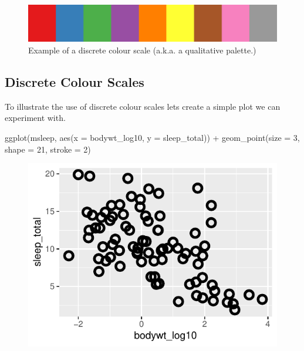 \vspace{2em}

\begin{figure}[H]
\centering
\includegraphics[scale = .4]{graphics/ch2Figs/col_discrete.pdf}
\caption{Example of a discrete colour scale (a.k.a. a qualitative palette.)}
\label{fig:discrete_col_scale}
\end{figure}

\vspace{1em}

\subsection{Discrete Colour Scales}
\label{sec:discrete_cols}

To illustrate the use of discrete colour scales lets create a simple plot we can experiment with.

\begin{inR}
ggplot(msleep, aes(x = bodywt_log10, y = sleep_total)) +
  geom_point(size = 3, shape = 21, stroke = 2)
\end{inR}

\vspace{2em}

\begin{figure}[H]
\includegraphics[scale = .75]{graphics/ch2Figs/ggEx_20.pdf}
\end{figure}

